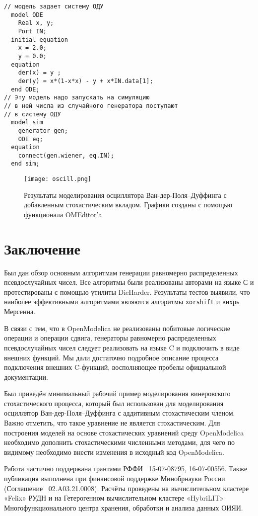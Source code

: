 \documentclass[%
floatfix,
showkeys,
nofootinbib, %
superscriptaddress, %
]{revtex4-1}
\begin{document}
\begin{verbatim}
// модель задает систему ОДУ
  model ODE
    Real x, y;
    Port IN;
  initial equation
    x = 2.0;
    y = 0.0;
  equation
    der(x) = y ;
    der(y) = x*(1-x*x) - y + x*IN.data[1];
  end ODE;
// Эту модель надо запускать на симуляцию
// в ней числа из случайного генератора поступают
// в систему ОДУ
  model sim
    generator gen;
    ODE eq;
  equation
    connect(gen.wiener, eq.IN);
  end sim;
\end{verbatim}

\begin{figure}
  \centering
  \texttt{[image: oscill.png]}
  \caption{Результаты моделирования осциллятора Ван-дер-Поля–Дуффинга с добавленным стохастическим вкладом. Графики созданы с помощью функционала OMEditor'a}
  \label{fig:vanderpolduff}
\end{figure}




\section{Заключение}

Был дан обзор основным алгоритмам генерации равномерно распределенных
псевдослучайных чисел. Все алгоритмы были реализованы авторами на
языке С и протестированы с помощью утилиты DieHarder. Результаты
тестов выявили, что наиболее эффективными алгоритмами являются
алгоритмы \texttt{xorshift} и вихрь Мерсенна.

В связи с тем, что в OpenModelica не реализованы побитовые логические
операции и операции сдвига, генераторы равномерно распределенных
псевдослучайных чисел следует реализовать на языке C и подключить в
виде внешних функций. Мы дали достаточно подробное описание процесса
подключения внешних C-функций, восполняющее пробелы официальной
документации.
        
Был приведён минимальный рабочий пример моделирования винеровского
стохастического процесса, который был использован для моделирования
осциллятор Ван-дер-Поля–Дуффинга с аддитивным стохастическим членом.
Важно отметить, что такое уравнение не является стохастическим. Для
построения моделей на основе стохастических уравнений среду
OpenModelica необходимо дополнить стохастическими численными методами,
для чего по видимому необходимо внести изменения в исходный код
OpenModelica.

\def\acknowledgmentsname{Благодарности}

\begin{acknowledgments}



Работа частично поддержана грантами РФФИ \textnumero~15-07-08795, 16-07-00556.
Также публикация выполнена при финансовой поддержке Минобрнауки России
(Соглашение \textnumero~02.A03.21.0008). 
Расчёты проведены на вычислительном кластере «Felix» РУДН и на
Гетерогенном вычислительном кластере «HybriLIT» Многофункционального
центра хранения, обработки и анализа данных ОИЯИ.

\end{acknowledgments}


  {}
  {}


\end{document}
